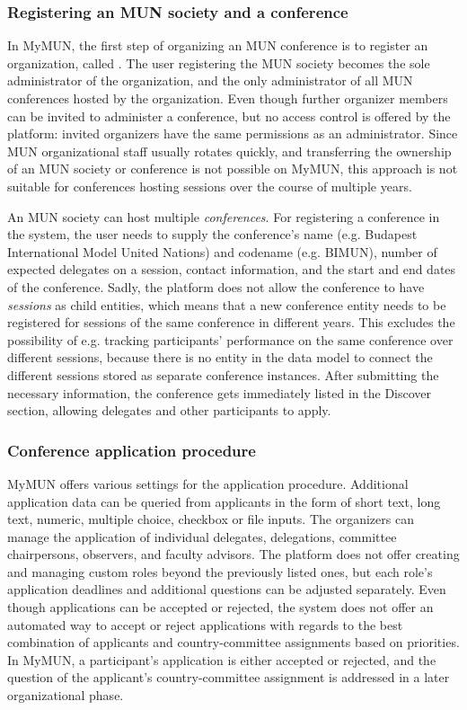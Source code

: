 \subsubsection{Registering an MUN society and a conference}

In MyMUN, the first step of organizing an MUN conference is to register an organization, called . The user registering the MUN society becomes the sole administrator of the organization, and the only administrator of all MUN conferences hosted by the organization. Even though further organizer members can be invited to administer a conference, but no access control is offered by the platform: invited organizers have the same permissions as an administrator. Since MUN organizational staff usually rotates quickly, and transferring the ownership of an MUN society or conference is not possible on MyMUN, this approach is not suitable for conferences hosting sessions over the course of multiple years.

An MUN society can host multiple \emph{conferences}. For registering a conference in the system, the user needs to supply the conference's name (e.g. Budapest International Model United Nations) and codename (e.g. BIMUN), number of expected delegates on a session, contact information, and the start and end dates of the conference. Sadly, the platform does not allow the conference to have \emph{sessions} as child entities, which means that a new conference entity needs to be registered for sessions of the same conference in different years. This excludes the possibility of e.g. tracking participants' performance on the same conference over different sessions, because there is no entity in the data model to connect the different sessions stored as separate conference instances. After submitting the necessary information, the conference gets immediately listed in the Discover section, allowing delegates and other participants to apply.

\subsubsection{Conference application procedure}

MyMUN offers various settings for the application procedure. Additional application data can be queried from applicants in the form of short text, long text, numeric, multiple choice, checkbox or file inputs. The organizers can manage the application of individual delegates, delegations, committee chairpersons, observers, and faculty advisors. The platform does not offer creating and managing custom roles beyond the previously listed ones, but each role's application deadlines and additional questions can be adjusted separately. Even though applications can be accepted or rejected, the system does not offer an automated way to accept or reject applications with regards to the best combination of applicants and country-committee assignments based on priorities. In MyMUN, a participant's application is either accepted or rejected, and the question of the applicant's country-committee assignment is addressed in a later organizational phase.

